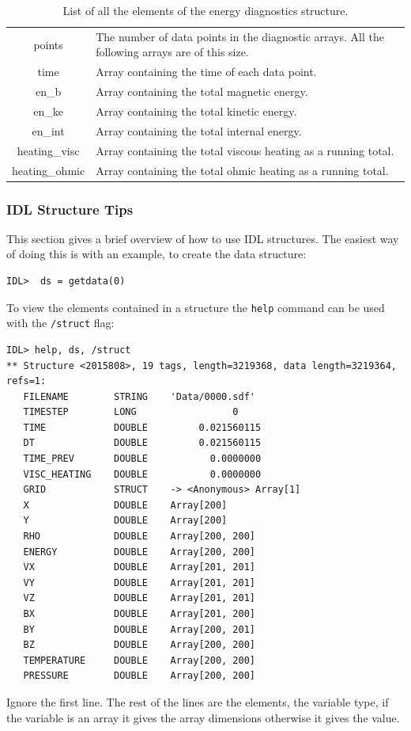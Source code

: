 \documentclass[11pt]{article}
\begin{document}
\begin{table}[!htbp]
\begin{tabular}{|c|p{}|}
\hline
points& The number of data points in the diagnostic arrays. All the following arrays are of this size.\\
time& Array containing the time of each data point.\\
en\_b & Array containing the total magnetic energy.\\
en\_ke & Array containing the total kinetic energy.\\
en\_int&Array containing the total internal energy.\\
heating\_visc& Array containing the total viscous heating as a running total.\\
heating\_ohmic& Array containing the total ohmic heating as a running total.\\
\hline
\end{tabular}
\caption{List of all the elements of the energy diagnostics structure.}
\label{enstructure}
\end{table}

\subsubsection{IDL Structure Tips}
\label{IDLtips}
This section gives a brief overview of how to use IDL structures. The easiest way of doing this is with an example, 
to create the data structure:
\begin{verbatim}
IDL>  ds = getdata(0)
\end{verbatim}

To view the elements contained in a structure the \texttt{help} command can be used with the \texttt{/struct} flag:
\begin{verbatim}
IDL> help, ds, /struct
** Structure <2015808>, 19 tags, length=3219368, data length=3219364, refs=1:
   FILENAME        STRING    'Data/0000.sdf'
   TIMESTEP        LONG                 0
   TIME            DOUBLE         0.021560115
   DT              DOUBLE         0.021560115
   TIME_PREV       DOUBLE           0.0000000
   VISC_HEATING    DOUBLE           0.0000000
   GRID            STRUCT    -> <Anonymous> Array[1]
   X               DOUBLE    Array[200]
   Y               DOUBLE    Array[200]
   RHO             DOUBLE    Array[200, 200]
   ENERGY          DOUBLE    Array[200, 200]
   VX              DOUBLE    Array[201, 201]
   VY              DOUBLE    Array[201, 201]
   VZ              DOUBLE    Array[201, 201]
   BX              DOUBLE    Array[201, 200]
   BY              DOUBLE    Array[200, 201]
   BZ              DOUBLE    Array[200, 200]
   TEMPERATURE     DOUBLE    Array[200, 200]
   PRESSURE        DOUBLE    Array[200, 200]
\end{verbatim}
Ignore the first line. The rest of the lines are the elements, the variable type, if the variable is an array it 
gives the array dimensions otherwise it gives the value.
\end{document}
